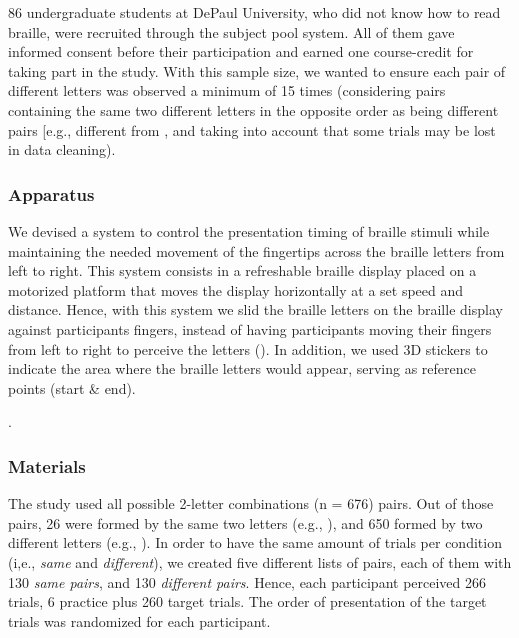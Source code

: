 \documentclass[english,man]{apa7}
\begin{document}
86 undergraduate students at DePaul University, who did not know how to read braille, were recruited through the subject pool system. All of them gave informed consent before their participation and earned one course-credit for taking part in the study. With this sample size, we wanted to ensure each pair of different letters was observed a minimum of 15 times (considering pairs containing the same two different letters in the opposite order as being different pairs {[}e.g.,   different from  \braille{l}{]}, and taking into account that some trials may be lost in data cleaning).

\hypertarget{apparatus}{%
\subsubsection{Apparatus}\label{apparatus}}

We devised a system to control the presentation timing of braille stimuli while maintaining the needed movement of the fingertips across the braille letters from left to right. This system consists in a refreshable braille display placed on a motorized platform that moves the display horizontally at a set speed and distance. Hence, with this system we slid the braille letters on the braille display against participants fingers, instead of having participants moving their fingers from left to right to perceive the letters ({\colorbox{blue}{\sffamily\scriptsize\bfseries\color{white}{abl}}}{\sffamily\small\itshape\color{blue}{see Appendix X for a a more detailed description and visualization of the apparatus}}). In addition, we used 3D stickers to indicate the area where the braille letters would appear, serving as reference points (start \& end).

{\colorbox{blue}{\sffamily\scriptsize\bfseries\color{white}{abl}}}{\sffamily\small\itshape\color{blue}{maybe add something like: even though this is not the most ecological way to read, participants' performance while using this "passive-haptic" method was similar to their performance using the active exploration of the patterns (MA Thesis)}}.

\hypertarget{materials}{%
\subsubsection{Materials}\label{materials}}

The study used all possible 2-letter combinations (n = 676) pairs. Out of those pairs, 26 were formed by the same two letters (e.g.,  ), and 650 formed by two different letters (e.g.,  ). In order to have the same amount of trials per condition (i,e., \emph{same} and \emph{different}), we created five different lists of pairs, each of them with 130 \emph{same pairs}, and 130 \emph{different pairs}. Hence, each participant perceived 266 trials, 6 practice plus 260 target trials. The order of presentation of the target trials was randomized for each participant.
\end{document}
